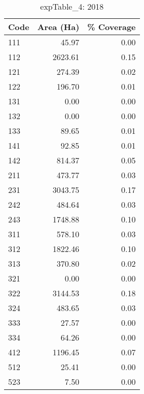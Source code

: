 \begin{table}[ht]
\centering
\begin{tabular}{lrr}
  \hline
Code & Area (Ha) & \% Coverage \\ 
  \hline
111 & 45.97 & 0.00 \\ 
  112 & 2623.61 & 0.15 \\ 
  121 & 274.39 & 0.02 \\ 
  122 & 196.70 & 0.01 \\ 
  131 & 0.00 & 0.00 \\ 
  132 & 0.00 & 0.00 \\ 
  133 & 89.65 & 0.01 \\ 
  141 & 92.85 & 0.01 \\ 
  142 & 814.37 & 0.05 \\ 
  211 & 473.77 & 0.03 \\ 
  231 & 3043.75 & 0.17 \\ 
  242 & 484.64 & 0.03 \\ 
  243 & 1748.88 & 0.10 \\ 
  311 & 578.10 & 0.03 \\ 
  312 & 1822.46 & 0.10 \\ 
  313 & 370.80 & 0.02 \\ 
  321 & 0.00 & 0.00 \\ 
  322 & 3144.53 & 0.18 \\ 
  324 & 483.65 & 0.03 \\ 
  333 & 27.57 & 0.00 \\ 
  334 & 64.26 & 0.00 \\ 
  412 & 1196.45 & 0.07 \\ 
  512 & 25.41 & 0.00 \\ 
  523 & 7.50 & 0.00 \\ 
   \hline
\end{tabular}
\caption{expTable\_4: 2018} 
\end{table}
